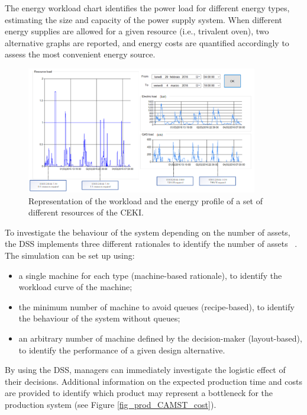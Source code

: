 The energy workload chart identifies the power load for different energy types, estimating the size and capacity of the power supply system. When different energy supplies are allowed for a given resource (i.e., trivalent oven), two alternative graphs are reported, and energy costs are quantified accordingly to assess the most convenient energy source.

\begin{figure}[hbt!]
\centering
\includegraphics[width=0.9\textwidth]{sectionProduction/design_plant_figures/fig_prod_CAMST_workload.png}
\captionsetup{type=figure}
\caption{Representation of the workload and the energy profile of a set of different resources of the CEKI.}
\label{fig_prod_CAMST_workload}
\end{figure}

To investigate the behaviour of the system depending on the number of assets, the DSS implements three different rationales to identify the number of assets ~\cite{Tufano2019_bookChapterPlantDesign}. The simulation can be set up using:

\begin{itemize}
    \item a single machine for each type (machine-based rationale), to identify the workload curve of the machine;
    \item the minimum number of machine to avoid queues (recipe-based), to identify the behaviour of the system without queues;
    \item an arbitrary number of machine defined by the decision-maker (layout-based), to identify the performance of a given design alternative.

\end{itemize}

By using the DSS, managers can immediately investigate the logistic effect of their decisions. Additional information on the expected production time and costs are provided to identify which product may represent a bottleneck for the production system (see Figure \ref{fig_prod_CAMST_cost}).

